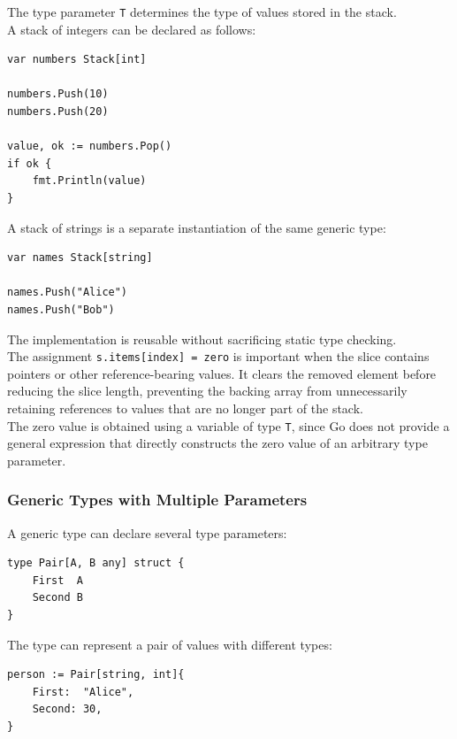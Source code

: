 The type parameter \texttt{T} determines the type of values stored in the stack.\\

A stack of integers can be declared as follows:

\begin{lstlisting}
var numbers Stack[int]

numbers.Push(10)
numbers.Push(20)

value, ok := numbers.Pop()
if ok {
    fmt.Println(value)
}
\end{lstlisting}

A stack of strings is a separate instantiation of the same generic type:

\begin{lstlisting}
var names Stack[string]

names.Push("Alice")
names.Push("Bob")
\end{lstlisting}

The implementation is reusable without sacrificing static type checking.\\

The assignment \texttt{s.items[index] = zero} is important when the slice contains pointers or other reference-bearing values. It clears the removed element before reducing the slice length, preventing the backing array from unnecessarily retaining references to values that are no longer part of the stack.\\

The zero value is obtained using a variable of type \texttt{T}, since Go does not provide a general expression that directly constructs the zero value of an arbitrary type parameter.

\subsubsection{Generic Types with Multiple Parameters}

A generic type can declare several type parameters:

\begin{lstlisting}
type Pair[A, B any] struct {
    First  A
    Second B
}
\end{lstlisting}

The type can represent a pair of values with different types:

\begin{lstlisting}
person := Pair[string, int]{
    First:  "Alice",
    Second: 30,
}
\end{lstlisting}

